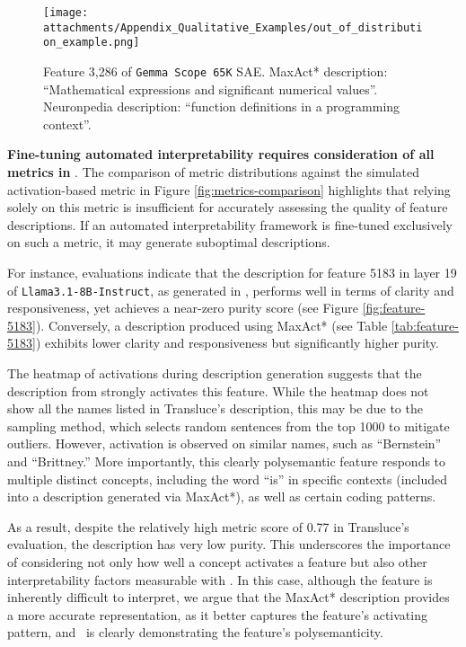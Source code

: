  \begin{figure*}
    \centering
    \texttt{[image: attachments/Appendix\_Qualitative\_Examples/out\_of\_distribution\_example.png]}
    \caption{Feature 3,286 of \texttt{Gemma Scope 65K} SAE. MaxAct* description: ``Mathematical expressions and significant numerical values''. Neuronpedia description: ``function definitions in a programming context''. }
    \label{fig:new-line-example}
\end{figure*}

\textbf{Fine-tuning automated interpretability requires consideration of all metrics in \ours}. The comparison of metric distributions against the simulated activation-based metric in Figure \ref{fig:metrics-comparison} highlights that relying solely on this metric is insufficient for accurately assessing the quality of feature descriptions. If an automated interpretability framework is fine-tuned exclusively on such a metric, it may generate suboptimal descriptions.

For instance, evaluations indicate that the description for feature 5183 in layer 19 of \texttt{Llama3.1-8B-Instruct}, as generated in \cite{choi2024automatic}, performs well in terms of clarity and responsiveness, yet achieves a near-zero purity score (see Figure \ref{fig:feature-5183}). Conversely, a description produced using MaxAct* (see Table \ref{tab:feature-5183}) exhibits lower clarity and responsiveness but significantly higher purity.

The heatmap of activations during description generation suggests that the description from \cite{choi2024automatic} strongly activates this feature. While the heatmap does not show all the names listed in Transluce’s description, this may be due to the sampling method, which selects random sentences from the top 1000 to mitigate outliers. However, activation is observed on similar names, such as “Bernstein” and “Brittney.” More importantly, this clearly polysemantic feature responds to multiple distinct concepts, including the word “is” in specific contexts (included into a description generated via MaxAct*), as well as certain coding patterns. 

As a result, despite the relatively high metric score of 0.77 in Transluce’s evaluation, the description has very low purity. This underscores the importance of considering not only how well a concept activates a feature but also other interpretability factors measurable with \ours. In this case, although the feature is inherently difficult to interpret, we argue that the MaxAct* description provides a more accurate representation, as it better captures the feature’s activating pattern, and \ours\ is clearly demonstrating the feature's polysemanticity.


